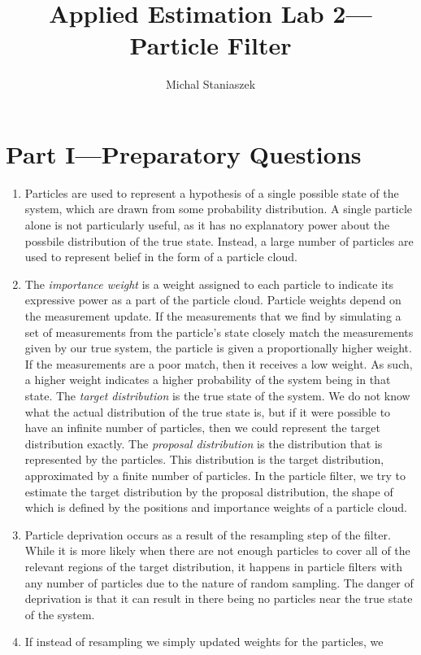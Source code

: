 \documentclass[a4paper,12pt]{article}
\title{Applied Estimation Lab 2---Particle Filter}
\author{Michal Staniaszek}
\begin{document}
\maketitle
\section{Part I---Preparatory Questions}
\begin{enumerate}
\item Particles are used to represent a hypothesis of a single possible state of
  the system, which are drawn from some probability distribution. A single
  particle alone is not particularly useful, as it has no explanatory power
  about the possbile distribution of the true state. Instead, a large number of
  particles are used to represent belief in the form of a particle cloud.
\item The \emph{importance weight} is a weight assigned to each particle to
  indicate its expressive power as a part of the particle cloud. Particle
  weights depend on the measurement update. If the measurements that we find by
  simulating a set of measurements from the particle's state closely match the
  measurements given by our true system, the particle is given a proportionally
  higher weight. If the measurements are a poor match, then it receives a low
  weight. As such, a higher weight indicates a higher probability of the system
  being in that state. The \emph{target distribution} is the true state of the
  system. We do not know what the actual distribution of the true state is, but
  if it were possible to have an infinite number of particles, then we could
  represent the target distribution exactly. The \emph{proposal distribution} is
  the distribution that is represented by the particles. This distribution is
  the target distribution, approximated by a finite number of particles. In the
  particle filter, we try to estimate the target distribution by the proposal
  distribution, the shape of which is defined by the positions and importance
  weights of a particle cloud.
\item Particle deprivation occurs as a result of the resampling step of the
  filter. While it is more likely when there are not enough particles to cover
  all of the relevant regions of the target distribution, it happens in particle
  filters with any number of particles due to the nature of random sampling. The
  danger of deprivation is that it can result in there being no particles near
  the true state of the system.
\item If instead of resampling we simply updated weights for the particles, we

\end{enumerate}
\end{document}
